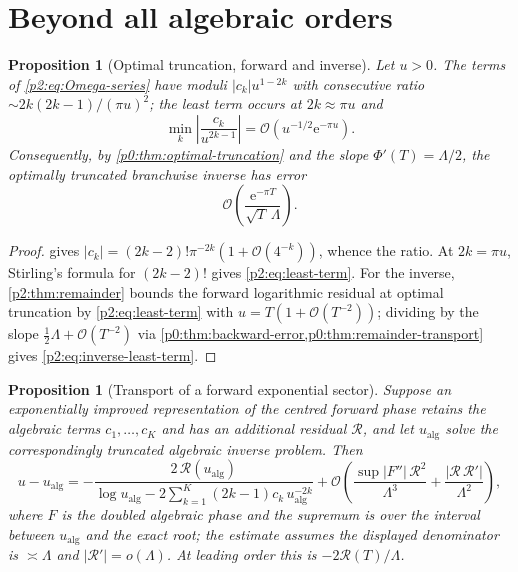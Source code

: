 \documentclass[11pt,a4paper,oneside]{book}
\theoremstyle{plain}
\newtheorem{proposition}[theorem]{Proposition}
\theoremstyle{definition}
\theoremstyle{remark}
\newcommand{\e}{\mathrm{e}}
\newcommand{\bigO}{\mathcal{O}}
\newcommand{\littleo}{o}
\begin{document}
\section{Beyond all algebraic orders}
\label{p2:sec:beyond}

\begin{proposition}[Optimal truncation, forward and inverse]
\label{p2:prop:least-term}
Let \(u>0\).  The terms of \cref{p2:eq:Omega-series} have moduli
\(|c_k|u^{1-2k}\) with consecutive ratio
\(\sim2k(2k-1)/(\pi u)^2\); the least term occurs at \(2k\approx\pi u\) and
\begin{equation}
 \min_k\left|\frac{c_k}{u^{2k-1}}\right|
 =\bigO\!\left(u^{-1/2}\e^{-\pi u}\right).
 \label{p2:eq:least-term}
\end{equation}
Consequently, by \cref{p0:thm:optimal-truncation} and the slope
\(\Phi'(T)=\Lambda/2\), the optimally truncated branchwise inverse has error
\begin{equation}
 \bigO\!\left(\frac{\e^{-\pi T}}{\sqrt T\,\Lambda}\right).
 \label{p2:eq:inverse-least-term}
\end{equation}
\end{proposition}

\begin{proof}
 gives \(|c_k|=(2k-2)!\pi^{-2k}(1+\bigO(4^{-k}))\), whence
the ratio.  At \(2k=\pi u\), Stirling's formula for \((2k-2)!\) gives
\cref{p2:eq:least-term}.  For the inverse, \cref{p2:thm:remainder} bounds the
forward logarithmic residual at optimal truncation by
\cref{p2:eq:least-term} with \(u=T(1+\bigO(T^{-2}))\); dividing by the slope
\(\tfrac12\Lambda+\bigO(T^{-2})\) via
\cref{p0:thm:backward-error,p0:thm:remainder-transport} gives
\cref{p2:eq:inverse-least-term}.
\end{proof}

\begin{proposition}[Transport of a forward exponential sector]
\label{p2:prop:transport}
Suppose an exponentially improved representation of the centred forward phase
retains the algebraic terms \(c_1,\dots,c_K\) and has an additional residual
\(\mathcal R\), and let \(u_{\mathrm{alg}}\) solve the correspondingly
truncated algebraic inverse problem.  Then
\begin{equation}
 u-u_{\mathrm{alg}}
 =-\frac{2\,\mathcal R(u_{\mathrm{alg}})}
   {\log u_{\mathrm{alg}}
    -2\sum_{k=1}^{K}(2k-1)c_k\,u_{\mathrm{alg}}^{-2k}}
 +\bigO\!\left(\frac{\sup|F''|\,\mathcal R^2}{\Lambda^3}
   +\frac{|\mathcal R\,\mathcal R'|}{\Lambda^2}\right),
 \label{p2:eq:transport}
\end{equation}
where \(F\) is the doubled algebraic phase and the supremum is over the
interval between \(u_{\mathrm{alg}}\) and the exact root; the estimate assumes
the displayed denominator is \(\asymp\Lambda\) and
\(|\mathcal R'|=\littleo(\Lambda)\).  At leading order this is
\(-2\mathcal R(T)/\Lambda\).
\end{proposition}
\end{document}
